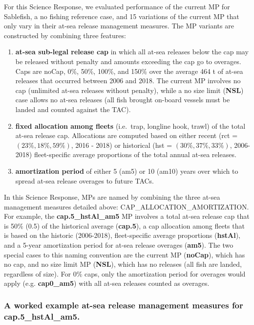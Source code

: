 \documentclass[11pt]{book}
\begin{document}
For this Science Response, we evaluated performance of the current MP for Sablefish, a no fishing reference case, and 15 variations of the current MP that only vary in their at-sea release management measures. The MP variants are constructed by combining three features:
\begin{enumerate}
\def\labelenumi{\arabic{enumi}.}

\item
  \textbf{at-sea sub-legal release cap} in which all at-sea releases below the cap may be released without penalty and amounts exceeding the cap go to overages. Caps are noCap, 0\%, 50\%, 100\%, and 150\% over the average 464 t of at-sea releases that occurred between 2006 and 2018. The current MP involves no cap (unlimited at-sea releases without penalty), while a no size limit (\textbf{NSL}) case allows no at-sea releases (all fish brought on-board vessels must be landed and counted against the TAC).
\item
  \textbf{fixed allocation among fleets} (i.e.~trap, longline hook, trawl) of the total at-sea release cap. Allocations are computed based on either recent (rct = \((23\%, 18\%, 59\%)\), 2016 - 2018) or historical (hst = \((30\%, 37\%, 33\%)\), 2006-2018) fleet-specific average proportions of the total annual at-sea releases.
\item
  \textbf{amortization period} of either 5 (am5) or 10 (am10) years over which to spread at-sea release overages to future TACs.
\end{enumerate}
In this Science Response, MPs are named by combining the three at-sea management measures detailed above: CAP\_ALLOCATION\_AMORTIZATION. For example, the \textbf{cap.5\_hstAl\_am5} MP involves a total at-sea release cap that is 50\% (0.5) of the historical average (\textbf{cap.5}), a cap allocation among fleets that is based on the historic (2006-2018), fleet-specific average proportions (\textbf{hstAl}), and a 5-year amortization period for at-sea release overages (\textbf{am5}). The two special cases to this naming convention are the current MP (\textbf{noCap}), which has no cap, and no size limit MP (\textbf{NSL}), which has no releases (all fish are landed, regardless of size). For 0\% caps, only the amortization period for overages would apply (e.g. \textbf{cap0\_am5}) with all at-sea releases counted as overages.

\hypertarget{a-worked-example-at-sea-release-management-measures-for-cap.5_hstal_am5.}{%
\subsubsection{\texorpdfstring{A worked example at-sea release management measures for \textbf{cap.5\_hstAl\_am5}.}{A worked example at-sea release management measures for cap.5\_hstAl\_am5.}}\label{a-worked-example-at-sea-release-management-measures-for-cap.5_hstal_am5.}}
\end{document}
